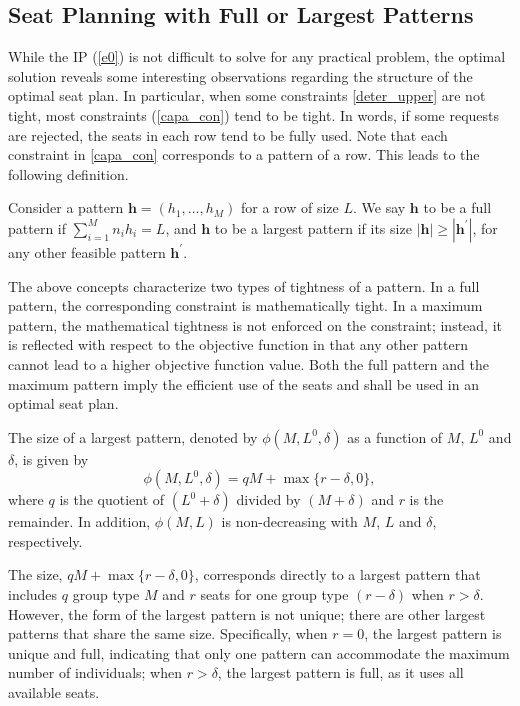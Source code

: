 \subsection{Seat Planning with Full or Largest Patterns}\label{seat_planning_full_largest}
While the IP (\ref{e0}) is not difficult to solve for any practical problem, the optimal solution reveals some interesting observations regarding the structure  of the optimal seat plan. In particular, when some constraints \eqref{deter_upper} are not tight, most constraints (\ref{capa_con}) tend to be tight. In words, if some requests are rejected, the seats in each row tend to be fully used. Note that each constraint in \eqref{capa_con} corresponds to a pattern of a row.
This leads to the following definition.

\begin{definition}
Consider a pattern $\bm{h} = (h_1, \ldots, h_M)$ for a row of size $L$. We say $\bm{h}$ to be a full pattern if $\sum_{i=1}^{M} n_i h_i = L$, and $\bm{h}$ to be a largest pattern if its size $|\bm{h}| \geq |\bm{h}^{\prime}|$, for any other feasible pattern $\bm{h}^{\prime}$.
\end{definition}

The above concepts characterize two types of tightness of a pattern. In a full pattern, the corresponding constraint is mathematically tight. In a  maximum pattern, the mathematical tightness is not enforced on the constraint; instead, it is reflected with respect to the objective function in that any other pattern cannot lead to a higher objective function   value. Both the full pattern and the maximum pattern imply the efficient use of the seats and shall be used in an optimal seat plan.

\begin{prop}\label{lem_pattern}
The size of a largest pattern, denoted by $\phi(M, L^{0}, \delta)$ as a function of $M$, $L^{0}$ and $\delta$, is given by $$\phi(M, L^{0}, \delta) = q M + \max\{r-\delta, 0\},$$ where $q$ is the quotient of $(L^{0} + \delta)$ divided by $(M+\delta)$ and $r$ is the remainder. In addition, $\phi(M,L)$ is non-decreasing with $M$, $L$ and $\delta$, respectively. 
\end{prop}

The size, $qM + \max\{r-\delta, 0\}$, corresponds directly to a largest pattern that includes $q$ group type $M$ and $r$ seats for one group type $(r-\delta)$ when $r>\delta$. However, the form of the largest pattern is not unique; there are other largest patterns that share the same size. 
Specifically, when $r = 0$, the largest pattern is unique and full, indicating that only one pattern can accommodate the maximum number of individuals; when $r > \delta$, the largest pattern is full, as it uses all available seats.


